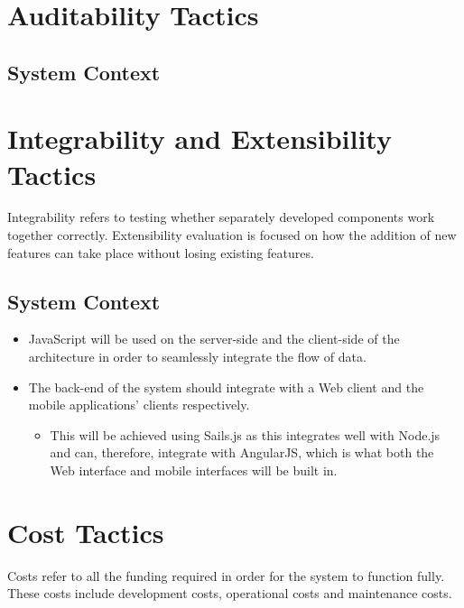 \documentclass[11pt,fleqn]{book} %
\begin{document}
	\section{Auditability Tactics}
	\subsection{System Context}
	
	\section{Integrability and Extensibility Tactics}
	Integrability refers to testing whether separately developed components work together correctly. Extensibility evaluation is focused on how the addition of new features can take place without losing existing features.
	\subsection{System Context}
	\begin{itemize}
		\item JavaScript will be used on the server-side and the client-side of the architecture in order to seamlessly integrate the flow of data.
		\item The back-end of the system should integrate with a Web client and the mobile applications’ clients respectively.
		\begin{itemize}
			\item This will be achieved using Sails.js as this integrates well with Node.js and can, therefore, integrate with AngularJS, which is what both the Web interface and mobile interfaces will be built in.
		\end{itemize}
		
	\end{itemize}
	
	\section{Cost Tactics}
	Costs refer to all the funding required in order for the system to function fully. These costs include development costs, operational costs and maintenance costs.
\end{document}
